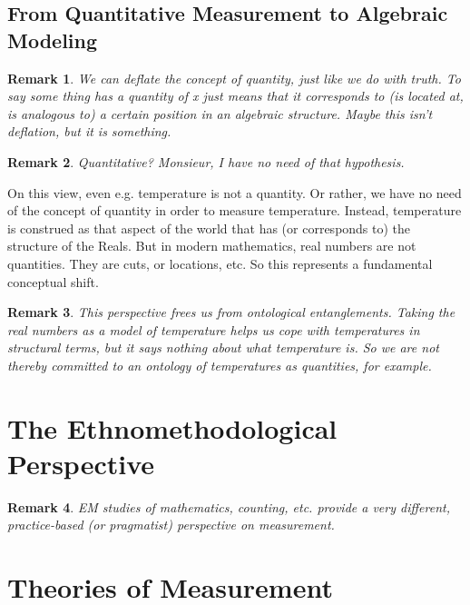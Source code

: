 \documentclass[11pt,twoside]{article}
\newtheorem{remark}{Remark}
\begin{document}
\subsection{From Quantitative Measurement to Algebraic Modeling}

\begin{remark}
  We can deflate the concept of quantity, just like we do with truth.
  To say some thing has a quantity of x just means that it corresponds
  to (is located at, is analogous to) a certain position in an algebraic
  structure.  Maybe this isn't deflation, but it is something.
\end{remark}

\begin{remark}
  Quantitative?  Monsieur, I have no need of that hypothesis.
\end{remark}

On this view, even e.g. temperature is not a quantity.  Or rather, we
have no need of the concept of quantity in order to measure
temperature.  Instead, temperature is construed as that aspect of the
world that has (or corresponds to) the structure of the Reals.  But in
modern mathematics, real numbers are not quantities.  They are cuts,
or locations, etc.  So this represents a fundamental conceptual shift.

\begin{remark}
  This perspective frees us from ontological entanglements.  Taking
  the real numbers as a \textit{model} of temperature helps us cope
  with temperatures in structural terms, but it says nothing about
  what temperature \textit{is}.  So we are not thereby committed to an
  ontology of temperatures as quantities, for example.
\end{remark}

\section{The Ethnomethodological Perspective}

\begin{remark}
  EM studies of mathematics, counting, etc. provide a very different,
  practice-based (or pragmatist) perspective on measurement.
\end{remark}

\clearpage
\section{Theories of Measurement}
\end{document}
